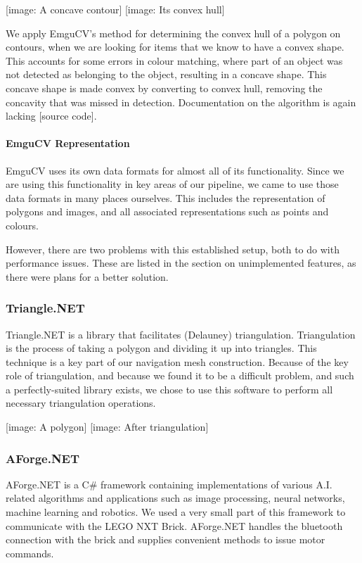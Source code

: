 \documentclass[10pt,twocolumn]{article}
\begin{document}
[image: A concave contour] [image: Its convex hull]

We apply EmguCV's method for determining the convex hull of a polygon on contours, when we are looking for items that we know to have a convex shape. This accounts for some errors in colour matching, where part of an object was not detected as belonging to the object, resulting in a concave shape. This concave shape is made convex by converting to convex hull, removing the concavity that was missed in detection. Documentation on the algorithm is again lacking [source code].

\paragraph{EmguCV Representation}
EmguCV uses its own data formats for almost all of its functionality. Since we are using this functionality in key areas of our pipeline, we came to use those data formats in many places ourselves. This includes the representation of polygons and images, and all associated representations such as points and colours.

However, there are two problems with this established setup, both to do with performance issues. These are listed in the section on unimplemented features, as there were plans for a better solution.

\subsubsection{Triangle.NET}
Triangle.NET is a library that facilitates (Delauney) triangulation. Triangulation is the process of taking a polygon and dividing it up into triangles. This technique is a key part of our navigation mesh construction. Because of the key role of triangulation, and because we found it to be a difficult problem, and such a perfectly-suited library exists, we chose to use this software to perform all necessary triangulation operations.

[image: A polygon] [image: After triangulation]

\subsubsection{AForge.NET}
AForge.NET is a C\# framework containing implementations of various A.I. related algorithms and applications such as image processing, neural networks, machine learning and robotics. We used a very small part of this framework to communicate with the LEGO NXT Brick. AForge.NET handles the bluetooth connection with the brick and supplies convenient methods to issue motor commands.
\end{document}

